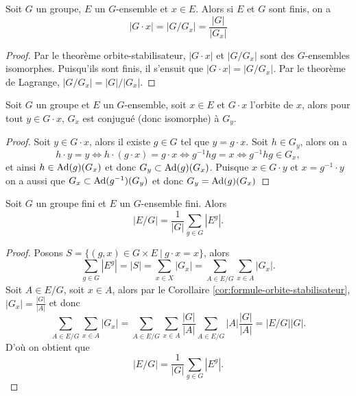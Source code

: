 \begin{corollary}
	\label{cor:formule-orbite-stabilisateur}
	Soit $G$ un groupe, $E$ un $G$-ensemble et $x \in E$.
	Alors si $E$ et $G$ sont finis, on a
	\begin{equation*}
		|G \cdot x| = |G/G_x| = \frac{|G|}{|G_x|}
	\end{equation*}
\end{corollary}

\begin{proof}
	Par le theorème orbite-stabilisateur, $|G \cdot x|$ et $|G/G_x|$
	sont des $G$-ensembles isomorphes. Puisqu'ils sont finis,
	il s'ensuit que $|G \cdot x| = |G/G_x|$.
	Par le theorème de Lagrange, $|G/G_x| = |G|/|G_x|$.
\end{proof}

\begin{proposition}
	Soit $G$ un groupe et $E$ un $G$-ensemble, soit $x \in E$ et
	$G \cdot x$ l'orbite de $x$, alors pour tout $y \in G \cdot x$,
	$G_x$ est conjugué (donc isomorphe) à $G_y$.
\end{proposition}

\begin{proof}
	Soit $y \in G \cdot x$, alors il existe $g \in G$ tel que $y = g \cdot x$.
	Soit $h \in G_y$, alors on a
	\begin{equation*}
		h \cdot y = y \iff h \cdot (g \cdot x) = g \cdot x \iff
		g^{-1} h g = x \iff g^{-1} h g \in G_x,
	\end{equation*}
	et ainsi $h \in \operatorname{Ad}(g)(G_x)$ et donc $G_y \subset \operatorname{Ad}(g)(G_x)$.
	Puisque $x \in G \cdot y$ et $x = g^{-1} \cdot y$ on a 
	aussi que $G_x \subset \operatorname{Ad}(g^{-1})(G_y)$ et donc $G_y = \operatorname{Ad}(g)(G_x)$
\end{proof}

\begin{theorem}
	Soit $G$ un groupe fini et $E$ un $G$-ensemble fini. Alors
	\begin{equation*}
		|E/G| = \frac{1}{|G|}\sum_{g \in G}|E^g|.
	\end{equation*}
\end{theorem}

\begin{proof}
	Posons $S = \{(g, x) \in G \times E\ |\ g \cdot x = x\}$, alors
	\begin{equation*}
		\sum_{g \in G} |E^g| = |S| = 
		\sum_{x \in X} |G_x| = \sum_{A \in E/G} \sum_{x \in A} |G_x|.
	\end{equation*}
	Soit $A \in E/G$, soit $x \in A$, alors par le Corollaire
	\ref{cor:formule-orbite-stabilisateur}, $|G_x| = \frac{|G|}{|A|}$ et donc
	\begin{equation*}
		\sum_{A \in E/G} \sum_{x \in A} |G_x| = \sum_{A \in E/G} \sum_{x \in A}\frac{|G|}{|A|}
		\sum_{A \in E/G} |A|\frac{|G|}{|A|} = |E/G||G|.
	\end{equation*}
	D'où on obtient que
	\begin{equation*}
		|E/G| = \frac{1}{|G|}\sum_{g \in G}|E^g|.
	\end{equation*}
\end{proof}

